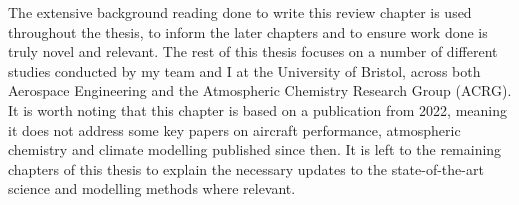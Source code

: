 The extensive background reading done to write this review chapter is used throughout the thesis, to inform the later chapters and to ensure work done is truly novel and relevant. The rest of this thesis focuses on a number of different studies conducted by my team and I at the University of Bristol, across both Aerospace Engineering and the Atmospheric Chemistry Research Group (ACRG). It is worth noting that this chapter is based on a publication from 2022, meaning it does not address some key papers on aircraft performance, atmospheric chemistry and climate modelling published since then. It is left to the remaining chapters of this thesis to explain the necessary updates to the state-of-the-art science and modelling methods where relevant.